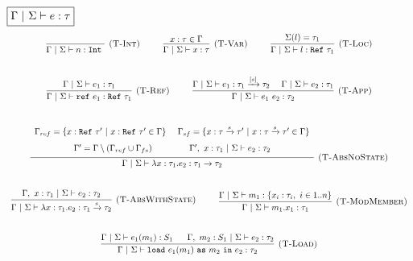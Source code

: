 \documentclass{llncs}
\newcommand{\keyw}[1]{\mathtt{#1}~}
\newcommand{\reftt}{\mathtt{ref}~}
\newcommand{\Reftt}{\mathtt{Ref}~}
\newcommand{\Inttt}{\mathtt{Int}~}
\begin{document}
$\fbox{$\Gamma~|~\Sigma \vdash e : \tau$}$
\[
\begin{array}{c}
\infer[\textsc{(T-Int)}]
  {\Gamma~|~\Sigma \vdash n : \Inttt}
  {}
~~~~~~~~  
\infer[\textsc{(T-Var)}]
  {\Gamma~|~\Sigma \vdash x : \tau}
  {x : \tau \in \Gamma}
~~~~~~~~  
\infer[\textsc{(T-Loc)}]
  {\Gamma~|~\Sigma \vdash l : \Reftt \tau_1}
  {\Sigma(l) = \tau_1}\\[5ex]

\infer[\textsc{(T-Ref)}]
  {\Gamma~|~\Sigma \vdash \reftt e_1 : \Reftt \tau_1}
  {\Gamma~|~\Sigma \vdash e_1 : \tau_1}
~~~~~~~~
\infer[\textsc{(T-App)}]
  {\Gamma~|~\Sigma \vdash e_1~e_2 : \tau_2}
  {\Gamma~|~\Sigma \vdash e_1 : \tau_1 \xrightarrow{[s]} \tau_2
  ~~~~ \Gamma~|~\Sigma \vdash e_2 : \tau_1}\\[5ex]

\infer[\textsc{(T-AbsNoState)}]
  {\Gamma~|~\Sigma \vdash \lambda x : \tau_1.e_2 : \tau_1 \rightarrow \tau_2}
  {\def\arraystretch{1.6}
  \begin{array}{c}
\Gamma_{ref} = \{x : \Reftt \tau'~|~ x : \Reftt \tau' \in \Gamma\}~~~~
\Gamma_{sf} = \{ x : \tau \xrightarrow{s} \tau'~|~x : \tau \xrightarrow{s} \tau' \in \Gamma \} \\
\Gamma' = \Gamma \setminus (\Gamma_{ref} \cup \Gamma_{fs})~~~~~~~~~~~~~\Gamma',~x : \tau_1~|~\Sigma \vdash e_2 : \tau_2
  \end{array}}\\[5ex]

\infer[\textsc{(T-AbsWithState)}]
  {\Gamma~|~\Sigma \vdash \lambda x : \tau_1.e_2 : \tau_1 \xrightarrow{s} \tau_2}
  {\Gamma,~x : \tau_1~|~\Sigma \vdash e_2 : \tau_2}
~~~~~~~~
\infer[\textsc{(T-ModMember)}]
  {\Gamma~|~\Sigma \vdash m_1.x_1 : \tau_1}
  {\Gamma~|~\Sigma \vdash m_1 : \{ x_i : \tau_i,~i \in 1..n\}}\\[5ex]

\infer[\textsc{(T-Load)}]
  {\Gamma~|~\Sigma \vdash \keyw{load} e_1(m_1)~\keyw{as} m_2~\keyw{in} e_2 : \tau_2}
  {\Gamma~|~\Sigma \vdash e_1(m_1) : S_1~~~~~\Gamma,~m_2 : S_1~|~\Sigma \vdash e_2 : \tau_2}\\[5ex]



\end{array}\]
\end{document}
